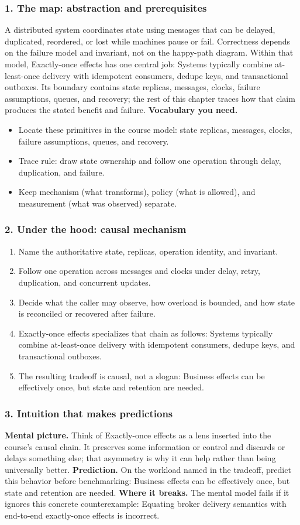 \subsubsection*{1. The map: abstraction and prerequisites}
A distributed system coordinates state using messages that can be delayed, duplicated, reordered, or lost while machines pause or fail. Correctness depends on the failure model and invariant, not on the happy-path diagram.
Within that model, Exactly-once effects has one central job: Systems typically combine at-least-once delivery with idempotent consumers, dedupe keys, and transactional outboxes. Its boundary contains state replicas, messages, clocks, failure assumptions, queues, and recovery; the rest of this chapter traces how that claim produces the stated benefit and failure.
\textbf{Vocabulary you need.}\begin{itemize}
\item Locate these primitives in the course model: state replicas, messages, clocks, failure assumptions, queues, and recovery.
\item Trace rule: draw state ownership and follow one operation through delay, duplication, and failure.
\item Keep mechanism (what transforms), policy (what is allowed), and measurement (what was observed) separate.
\end{itemize}
\subsubsection*{2. Under the hood: causal mechanism}\begin{enumerate}
\item Name the authoritative state, replicas, operation identity, and invariant.
\item Follow one operation across messages and clocks under delay, retry, duplication, and concurrent updates.
\item Decide what the caller may observe, how overload is bounded, and how state is reconciled or recovered after failure.
\item Exactly-once effects specializes that chain as follows: Systems typically combine at-least-once delivery with idempotent consumers, dedupe keys, and transactional outboxes.
\item The resulting tradeoff is causal, not a slogan: Business effects can be effectively once, but state and retention are needed.
\end{enumerate}
\subsubsection*{3. Intuition that makes predictions}
\textbf{Mental picture.} Think of Exactly-once effects as a lens inserted into the course's causal chain. It preserves some information or control and discards or delays something else; that asymmetry is why it can help rather than being universally better.
\textbf{Prediction.} On the workload named in the tradeoff, predict this behavior before benchmarking: Business effects can be effectively once, but state and retention are needed.
\textbf{Where it breaks.} The mental model fails if it ignores this concrete counterexample: Equating broker delivery semantics with end-to-end exactly-once effects is incorrect.
